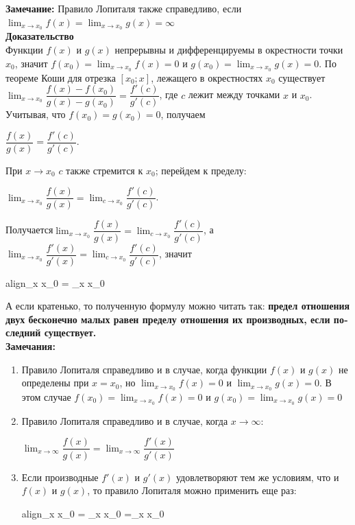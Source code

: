 \documentclass[oneside]{book}
\newcommand{\boxedeq}[2]{\begin{empheq}[box={\fboxsep=6pt\fbox}]{align}\label{#1}#2\end{empheq}}
\begin{document}
\begin{enumerate}
\begin{itemize}
\textbf{Замечание:}
Правило Лопиталя также справедливо, если  $\lim_{x \to x_{0}} f(x) =\lim_{x \to x_{0}} g(x) = \infty$\\

\textbf{Доказательство}\\
Функции $f(x)$ и $g(x)$ непрерывны и дифференцируемы в окрестности точки $x_{0}$, значит
$f(x_{0})=\lim_{x \to x_{0}} f(x) = 0$ и $g(x_{0})=\lim_{x \to x_{0}} g(x) = 0$. По теореме Коши для отрезка $[x_{0};x]$, лежащего в окрестностях $x_{0}$ существует $\lim_{x \rightarrow x_0} \dfrac{f(x)-f(x_{0})}{g(x)-g(x_{0})}=\dfrac{f'(c)}{g'(c)}$, где $c$ лежит между точками $x$ и $x_{0}$. Учитывая, что  $f(x_{0})=g(x_{0})=0$, получаем \begin{center}
	$\dfrac{f(x)}{g(x)}=\dfrac{f'(c)}{g'(c)}$.
\end{center} При $x\to x_{0}$ $c$ также стремится к $x_{0}$; перейдем к пределу: \begin{center}
	$\lim_{x \to x_{0}} \dfrac{f(x)}{g(x)} = \lim_{c \to x_{0}} \dfrac{f'(c)}{g'(c)}$.

\end{center}
Получается$\lim_{x \to x_{0}} \dfrac{f(x)}{g(x)} = \lim_{c \to x_{0}} \dfrac{f'(c)}{g'(c)}$, а $\lim_{x \to x_{0}} \dfrac{f'(x)}{g'(x)} = \lim_{c \to x_{0}} \dfrac{f'(c)}{g'(c)}$, значит \begin{center}
	\boxedeq{eq:*}{\lim_{x{\large } \to x_{0}}  = \lim_{x \to x_{0}} \dfrac{f'(x)}{g'(x)}}
\end{center}
А если кратенько, то полученную формулу можно читать так: \textbf{предел отношения двух
	бесконечно малых равен пределу отношения их производных, если по­
	следний существует.}\\

\textbf{Замечания:}
\begin{enumerate}

	\item Правило Лопиталя справедливо и в случае, когда функции $f(x)$ и $g(x)$ не определены при  $x=x_{0}$, но $\lim_{x \to x_{0}} f(x) = 0$ и $\lim_{x \to x_{0}} g(x) = 0$. В этом случае $f(x_{0})=\lim_{x \to x_{0}} f(x) = 0$ и $g(x_{0})=\lim_{x \to x_{0}} g(x) = 0$
	\item Правило Лопиталя справедливо и в случае, когда ${x \to \infty}$: \begin{center}
		$\lim_{x \to \infty} \dfrac{f(x)}{g(x)} = \lim_{x \to \infty} \dfrac{f'(x)}{g'(x)}$
	\end{center}
	\item Если производные $f'(x)$ и $g'(x)$ удовлетворяют тем же условиям, что и $f(x)$ и $g(x)$, то правило Лопиталя можно применить еще раз:\boxedeq{eq:*}{\lim_{x{\large } \to x_{0}}  = \lim_{x \to x_{0}} \dfrac{f'(x)}{g'(x)}=\lim_{x \to x_{0}} \dfrac{f''(x)}{g''(x)}}


\end{enumerate}
\end{itemize}
\end{enumerate}
\end{document}
